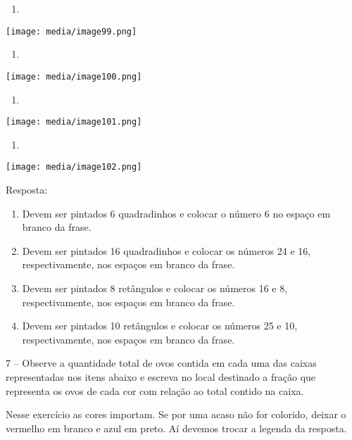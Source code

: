 \begin{enumerate}
\def\labelenumi{\alph{enumi})}
\item
\end{enumerate}

\texttt{[image: media/image99.png]}

\begin{enumerate}
\def\labelenumi{\alph{enumi})}
\item
\end{enumerate}

\texttt{[image: media/image100.png]}

\begin{enumerate}
\def\labelenumi{\alph{enumi})}
\item
\end{enumerate}

\texttt{[image: media/image101.png]}

\begin{enumerate}
\def\labelenumi{\alph{enumi})}
\item
\end{enumerate}

\texttt{[image: media/image102.png]}

Resposta:

\begin{enumerate}
\def\labelenumi{\alph{enumi})}
\item
  Devem ser pintados 6 quadradinhos e colocar o número 6 no espaço em
  branco da frase.
\item
  Devem ser pintados 16 quadradinhos e colocar os números 24 e 16,
  respectivamente, nos espaços em branco da frase.
\item
  Devem ser pintados 8 retângulos e colocar os números 16 e 8,
  respectivamente, nos espaços em branco da frase.
\item
  Devem ser pintados 10 retângulos e colocar os números 25 e 10,
  respectivamente, nos espaços em branco da frase.
\end{enumerate}

7 -- Observe a quantidade total de ovos contida em cada uma das caixas
representadas nos itens abaixo e escreva no local destinado a fração que
representa os ovos de cada cor com relação ao total contido na caixa.

Nesse exercício as cores importam. Se por uma acaso não for colorido,
deixar o vermelho em branco e azul em preto. Aí devemos trocar a legenda
da resposta.

